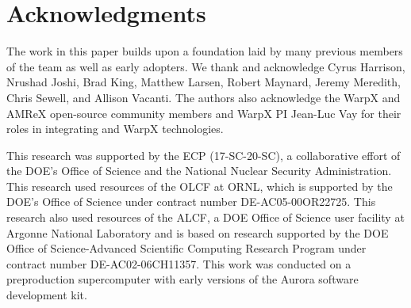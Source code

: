 \section{Acknowledgments}


The work in this paper builds upon a foundation laid by many previous members of the \vtkm team as well as early adopters.  We thank and acknowledge
Cyrus Harrison, 
Nrushad Joshi,
Brad King, 
Matthew Larsen,
Robert Maynard, 
Jeremy Meredith, 
Chris Sewell,
and
Allison Vacanti.
The authors also acknowledge
the WarpX and AMReX open-source community members and WarpX PI Jean-Luc Vay
for their roles in integrating \vtkm and WarpX technologies.

This research was supported by the ECP (17-SC-20-SC), a collaborative effort of the DOE's Office of Science and the National Nuclear Security Administration.
This research used resources of the OLCF at ORNL, which is supported by the DOE's Office of Science under contract number DE-AC05-00OR22725.
This research also used resources of the ALCF, a DOE Office of Science user facility at Argonne National Laboratory and is based on research supported by the DOE Office of Science-Advanced Scientific Computing Research Program under contract number DE-AC02-06CH11357. This work was conducted on a preproduction supercomputer with early versions of the Aurora software development kit.
